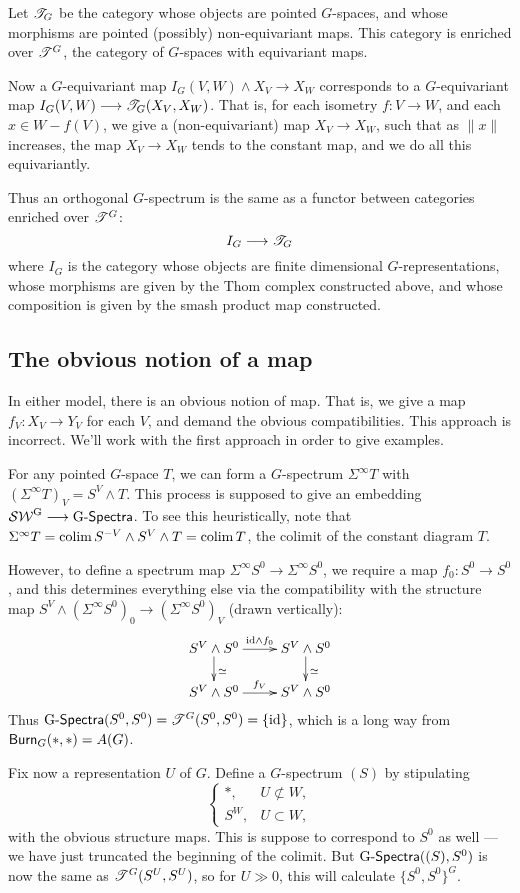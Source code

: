 \documentclass[11pt]{article}
\begin{document}
Let $\mathscr{T}_G$ be the category whose objects are pointed $G$-spaces, and whose morphisms are pointed (possibly) non-equivariant maps. This category is enriched over $\mathscr{T}^G$, the category of $G$-spaces with equivariant maps.

Now a $G$-equivariant map $I_G(V,W)\wedge X_V\to X_W$ corresponds to a $G$-equivariant map $I_G(V,W)\longrightarrow \mathscr{T}_G(X_V,X_W)$. That is, for each isometry $f:V\to W$, and each $x\in W-f(V)$, we give a (non-equivariant) map $X_V\to X_W$, such that as $\|x\|$ increases, the map $X_V\to X_W$ tends to the constant map, and we do all this equivariantly. 

Thus an orthogonal $G$-spectrum is the same as a functor between categories enriched over $\mathscr{T}^G$:
\[I_G\longrightarrow\mathscr{T}_G\]
where $I_G$ is the category whose objects are finite dimensional $G$-representations, whose morphisms are given by the Thom complex constructed above, and whose composition is given by the smash product map constructed. 
\subsection*{The obvious notion of a map}
In either model, there is an obvious notion of map. That is, we give a map $f_V:X_V\to Y_V$ for each $V$, and demand the obvious compatibilities. This approach is incorrect. We'll work with the first approach in order to give examples.
\begin{exmp*}
For any pointed $G$-space $T$, we can form a $G$-spectrum $\Sigma^\infty T$ with $(\Sigma^\infty T)_V=S^V\wedge T$. This process is supposed to give an embedding $\operatorname{{\mathcal{SW}^G}}\longrightarrow\operatorname{{G-\mathsf{Spectra}}}$. To see this heuristically, note that $\Sigma^\infty T=\operatorname{colim} S^{-V}\wedge S^V\wedge T=\operatorname{colim} T$, the colimit of the constant diagram $T$. 

However, to define a spectrum map $\Sigma^\infty S^0\to \Sigma^\infty S^0$, we require a map $f_0:S^0\to S^0$, and this determines everything else via the compatibility with the structure map $S^V\wedge(\Sigma^\infty S^0)_0\to(\Sigma^\infty S^0)_V$ (drawn vertically):
\[\xymatrix@R=.6cm{ 
\ar[d]^\simeq S^V\wedge S^0\ar[r]^{\id\wedge f_0}&S^V\wedge S^0\ar[d]^\simeq\\
S^V\wedge S^0\ar[r]^{f_V}&S^V\wedge S^0
}\]
Thus $\operatorname{{G-\mathsf{Spectra}}}(S^0,S^0)=\mathscr{T}^G(S^0,S^0)=\{\textup{id}\}$, which is a long way from $\operatorname{{\mathsf{Burn}}}_G(*,*)=A(G)$.
\end{exmp*}
Fix now a representation $U$ of $G$. Define a $G$-spectrum $(S)$ by stipulating
\[\begin{cases} *,&U\not\subset W,\\ S^W,&U\subset W,\end{cases}\]
with the obvious structure maps. This is suppose to correspond to $S^0$ as well --- we have just truncated the beginning of the colimit. But $\operatorname{{G-\mathsf{Spectra}}}((S),S^0)$ is now the same as $\mathscr{T}^G(S^U,S^U)$, so for $U\gg0$, this will calculate $\{S^0,S^0\}^G$.
\end{document}
